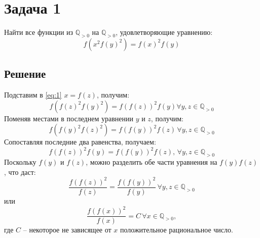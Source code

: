 \documentclass[11pt]{article}
\author{Sergey Makarov}
\date{\today}
\title{}
\def\zall{\setcounter{lem}{0}\setcounter{cnsqnc}{0}\setcounter{th}{0}\setcounter{Cmt}{0}\setcounter{equation}{0}}
\newcounter{lem}\setcounter{lem}{0}
\newcounter{th}\setcounter{th}{0}
\newcounter{cnsqnc}\setcounter{cnsqnc}{0}
\newcounter{Cmt}\setcounter{Cmt}{0}
\begin{document}
\section{Задача 1}
\label{sec:org4e38a95}
\zall
Найти все функции из \(\mathbb{Q}_{>0}\) на \(\mathbb{Q}_{>0}\), удовлетворяющие уравнению:
\begin{equation}
\label{eq:1}
f(x^2f(y)^2) = f(x)^2f(y)
\end{equation}
\subsection{Решение}
\label{sec:org7e93cac}
Подставим в \eqref{eq:1} \(x = f(z)\), получим:
\begin{equation*}
f(f(z)^2f(y)^2) = f(f(z))^2f(y) \forall y, z \in \mathbb{Q}_{>0}
\end{equation*}
Поменяв местами в последнем уравнении \(y\) и \(z\), получим:
\begin{equation*}
f(f(y)^2f(z)^2) = f(f(y))^2f(z) \,\forall y, z \in \mathbb{Q}_{>0}
\end{equation*}
Сопоставляя последние два равенства, получаем:
\begin{equation*}
f(f(z))^2f(y) = f(f(y))^2f(z), \,\forall y, z \in \mathbb{Q}_{>0}
\end{equation*}
Поскольку \(f(y)\) и \(f(z)\), можно разделить обе части уравнения на \(f(y)f(z)\), что даст:
\begin{equation*}
\frac{f(f(z))^2}{f(z)} = \frac{f(f(y))^2}{f(y)} \,\forall y, z \in \mathbb{Q}_{>0}
\end{equation*}
или
\begin{equation}\label{eq:simpleq}
\frac{f(f(x))^2}{f(x)} = C\, \forall x \in \mathbb{Q}_{>0},
\end{equation}
где \(C\) -- некоторое не зависящее от \(x\) положительное рациональное число.
\end{document}
